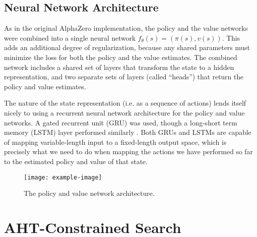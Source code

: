 \subsection{Neural Network Architecture}

As in the original AlphaZero implementation, the policy and the value networks were combined into a single neural network $f_\theta(s) = (\pi(s), v(s))$. This adds an additional degree of regularization, because any shared parameters must minimize the loss for both the policy and the value estimates. The combined network includes a shared set of layers that transform the state to a hidden representation, and two separate sets of layers (called ``heads'') that return the policy and value estimates.



The nature of the state representation (i.e. as a sequence of actions) lends itself nicely to using a recurrent neural network architecture for the policy and value networks. A gated recurrent unit (GRU) was used, though a long-short term memory (LSTM) layer performed similarly \cite{cho2014learning, lstm}.
Both GRUs and LSTMs are capable of mapping variable-length input to a fixed-length output space, which is precisely what we need to do when mapping the actions we have performed so far to the estimated policy and value of that state.

\begin{figure}
    \centering
    \texttt{[image: example-image]}
    \caption{The policy and value network architecture.}
    \label{fig:nn}
\end{figure}


\section{AHT-Constrained Search}


\lipsum[1-2]






